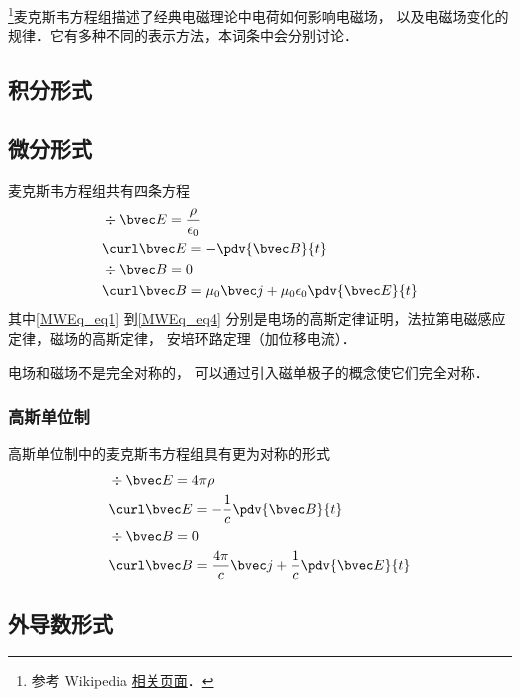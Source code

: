 
\begin{issues}
\issueDraft
\end{issues}

\footnote{参考 Wikipedia \href{https://en.wikipedia.org/wiki/Maxwell's_equations}{相关页面}．}麦克斯韦方程组描述了经典电磁理论中电荷如何影响电磁场， 以及电磁场变化的规律．它有多种不同的表示方法，本词条中会分别讨论．

\subsection{积分形式}


\subsection{微分形式}
麦克斯韦方程组共有四条方程
\begin{align}
\label{MWEq_eq1}
&\div \bvec E = \frac{\rho}{\epsilon_0}\\
\label{MWEq_eq2}
&\curl \bvec E = -\pdv{\bvec B}{t}\\
\label{MWEq_eq3}
&\div \bvec B = 0 \\
\label{MWEq_eq4}
&\curl \bvec B = \mu_0 \bvec j + \mu_0\epsilon_0 \pdv{\bvec E}{t}
\end{align}
其中\autoref{MWEq_eq1} 到\autoref{MWEq_eq4} 分别是电场的高斯定律证明，法拉第电磁感应定律，磁场的高斯定律， 安培环路定理（加位移电流）．%

电场和磁场不是完全对称的， 可以通过引入磁单极子的概念使它们完全对称．

\subsubsection{高斯单位制}
高斯单位制中的麦克斯韦方程组具有更为对称的形式
\begin{align}
&\div \bvec E = 4\pi\rho\\
&\curl \bvec E = -\frac{1}{c}\pdv{\bvec B}{t}\\
&\div \bvec B = 0 \\
&\curl \bvec B = \frac{4\pi}{c} \bvec j + \frac{1}{c}\pdv{\bvec E}{t}
\end{align}

\subsection{外导数形式}

